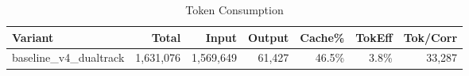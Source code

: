 \begin{table}[htbp]
\centering
\caption{Token Consumption}
\label{tab:tokens}
\begin{tabular}{l rrrr rr}
\toprule
Variant & Total & Input & Output & Cache\% & TokEff & Tok/Corr \\
\midrule
  baseline\_v4\_dualtrack & 1,631,076 & 1,569,649 & 61,427 & 46.5\% & 3.8\% & 33,287 \\
\bottomrule
\end{tabular}
\end{table}
